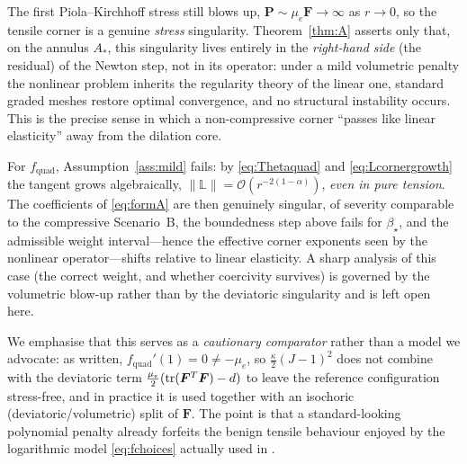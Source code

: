\begin{remark}
    The first Piola--Kirchhoff stress still blows up, $\bm{P}\sim \mu_e\bm{F}\to\infty$ as $r\to0$, so the tensile corner
    is a genuine \emph{stress} singularity. Theorem~\ref{thm:A} asserts only that, on the annulus $A_*$, this singularity
    lives entirely in the \emph{right-hand side} (the residual) of the Newton step, not in its operator: under a mild
    volumetric penalty the nonlinear problem inherits the regularity theory of the linear one, standard graded meshes
    restore optimal convergence, and no structural instability occurs. This is the precise sense in which a
    non-compressive corner ``passes like linear elasticity'' away from the dilation core.
\end{remark}

\begin{remark}
    \label{rem:quad}
    For $f_{\mathrm{quad}}$, Assumption~\ref{ass:mild} fails: by \eqref{eq:Thetaquad} and \eqref{eq:Lcornergrowth} the
    tangent grows algebraically, $\|\mathbb{L}\|=\mathcal{O}(r^{-2(1-\alpha)})$, \emph{even in pure tension}. The
    coefficients of \eqref{eq:formA} are then genuinely singular, of severity comparable to the compressive Scenario~B,
    the boundedness step above fails for $\beta_\star$, and the admissible weight interval---hence the effective corner
    exponents seen by the nonlinear operator---shifts relative to linear elasticity. A sharp analysis of this case (the
    correct weight, and whether coercivity survives) is governed by the volumetric blow-up rather than by the
    deviatoric singularity and is left open here.

    We emphasise that this serves as a \emph{cautionary comparator} rather than a model we advocate: as written,
    $f_{\mathrm{quad}}'(1)=0\ne-\mu_e$, so $\tfrac{\kappa}{2}(J-1)^2$ does not combine with the deviatoric term
    $\tfrac{\mu_e}{2}(\operatorname{tr}(\bm{F}^T\bm{F})-d)$ to leave the reference configuration stress-free, and in practice it is used
    together with an isochoric (deviatoric/volumetric) split of $\bm{F}$. The point is that a standard-looking polynomial
    penalty already forfeits the benign tensile behaviour enjoyed by the logarithmic model \eqref{eq:fchoices} actually
    used in \cite{cutfemAD}.
\end{remark}

